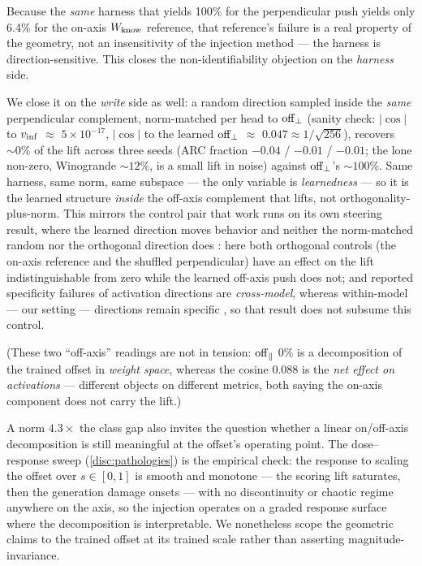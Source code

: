 Because the \emph{same} harness that yields 100\% for the perpendicular push yields
only 6.4\% for the on-axis $W_{\mathrm{know}}$ reference, that reference's failure is a real
property of the geometry, not an insensitivity of the injection method --- the
harness is direction-sensitive. This closes the non-identifiability objection
\citep{NonIdentifiability} on the \emph{harness} side.

We close it on the \emph{write} side as well: a random direction sampled inside the
\emph{same} perpendicular complement, norm-matched per head to $\mathrm{off}_{\perp}$ (sanity
check: $|\cos|$ to $v_{\mathrm{inf}}$ ${\approx}$ $5\times10^{-17}$, $|\cos|$ to the learned
$\mathrm{off}_{\perp}$ ${\approx}$ $0.047 \approx 1/\sqrt{256}$), recovers ${\sim}0\%$ of the
lift across three seeds (ARC fraction $-0.04$ / $-0.01$ / $-0.01$; the lone
non-zero, Winogrande ${\sim}12\%$, is a small lift in noise) against $\mathrm{off}_{\perp}$'s
${\sim}100\%$. Same harness, same norm, same subspace --- the only variable is
\emph{learnedness} --- so it is the learned structure \emph{inside} the off-axis
complement that lifts, not orthogonality-plus-norm. This mirrors the control pair
that work runs on its own steering result, where the learned direction moves
behavior and neither the norm-matched random nor the orthogonal direction does
\citep{ConfidenceManifold}: here both orthogonal controls (the on-axis reference and the
shuffled perpendicular) have an effect on the lift indistinguishable from zero
while the learned off-axis push does not; and reported specificity failures of
activation directions are \emph{cross-model}, whereas within-model --- our setting
--- directions remain specific \citep{SyedActivationDirections}, so that result
does not subsume this control.

(These two ``off-axis'' readings are not in tension: $\mathrm{off}_{\parallel}$ 0\% is a
decomposition of the trained offset in \emph{weight space}, whereas the cosine
0.088 is the \emph{net effect on activations} --- different objects on different
metrics, both saying the on-axis component does not carry the lift.)

A norm $4.3\times$ the class gap also invites the question whether a linear
on/off-axis decomposition is still meaningful at the offset's operating point. The
dose--response sweep (\cref{disc:pathologies}) is the empirical check: the response
to scaling the offset over $s \in [0, 1]$ is smooth and monotone --- the scoring
lift saturates, then the generation damage onsets --- with no discontinuity or
chaotic regime anywhere on the axis, so the injection operates on a graded response
surface where the decomposition is interpretable. We nonetheless scope the
geometric claims to the trained offset at its trained scale rather than asserting
magnitude-invariance.

